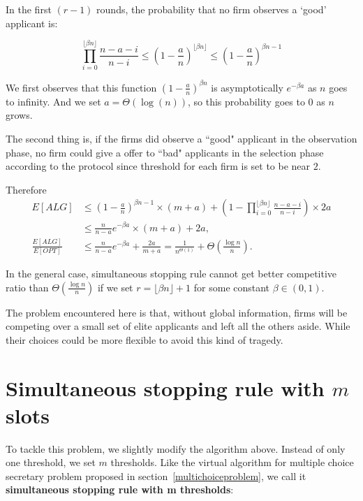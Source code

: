 In the first $(r - 1)$ rounds, the probability that no firm observes
a `good' applicant is:

$$\prod_{i=0}^{\lfloor \beta n \rfloor} \frac{n - a - i}{n - i}
\le (1 - \frac{a}{n})^{\lfloor \beta n \rfloor} \le (1 - \frac{a}{n})^{\beta n - 1}$$

We first observes that this function $(1 - \frac{a}{n})^{\beta n}$
is asymptotically $e^{-\beta a}$ as $n$ goes to infinity.
And we set $a = \Theta(\log(n))$, so this probability goes to $0$
as $n$ grows.

The second thing is, 
if the firms did observe a ``good" applicant in the observation phase, 
no firm could give a offer to ``bad" applicants in the selection 
phase according to the protocol
since threshold for each firm is set to be near $2$.

Therefore
\begin{align*}
    E[ALG]  & \le (1 - \frac{a}{n})^{\beta n - 1} \times (m + a)
                + (1 - \prod_{i=0}^{\lfloor \beta n \rfloor} \frac{n - a - i}{n - i}) \times 2a \\
            & \le \frac{n}{n - a} e^{- \beta a} \times (m + a) + 2a,\\
    \frac{E[ALG]}{E[OPT]} & \le \frac{n}{n - a} e^{- \beta a} + \frac{2a}{m+a}
            = \frac{1}{n^{\Theta(1)}} + \Theta(\frac{\log n}{n}).
\end{align*}

\begin{corollary}
In the general case, simultaneous stopping rule cannot get better competitive ratio than $\Theta(\frac{\log n}{n})$
if we set $r = \lfloor \beta n \rfloor + 1$ for some constant 
$\beta \in (0, 1)$.
\end{corollary}

The problem encountered here is that, without global information, firms
will be competing over a small set of elite applicants 
and left all the others aside. While their choices could be more flexible
to avoid this kind of tragedy.


\section{Simultaneous stopping rule with $m$ slots}

To tackle this problem, we slightly modify the algorithm above.
Instead of only one threshold, we set $m$ thresholds.
Like the virtual algorithm for multiple choice secretary problem proposed
in section~\ref{multichoiceproblem}, 
we call it \textbf{simultaneous stopping rule with m thresholds}:

